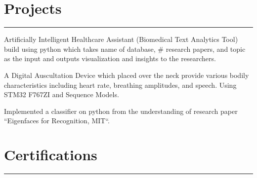 \documentclass[]{rahulworld-resume}
\begin{document}
\begin{minipage}[t]{0.66\textwidth}
\section{Projects}
\noindent\rule{12.5cm}{0.4pt}
\noindent
\hspace{1em}%
\begin{minipage}{0.95\textwidth\vspace{5pt}}
Artificially Intelligent Healthcare Assistant (Biomedical Text Analytics Tool) build using python which takes name of database, # research papers, and topic as the input and outputs visualization and insights to the researchers.
\end{minipage}


\noindent
\hspace{1em}%
\begin{minipage}{0.95\textwidth\vspace{5pt}}
A Digital Auscultation Device which placed over the neck provide various bodily characteristics including heart rate, breathing amplitudes, and speech. Using STM32 F767ZI and Sequence Models.
\end{minipage}


\noindent
\hspace{1em}%
\begin{minipage}{0.95\textwidth\vspace{5pt}}
Implemented a classifier on python from the understanding of research paper “Eigenfaces for Recognition, MIT“.
\end{minipage}

\section{Certifications} 
\noindent\rule{12.5cm}{0.4pt}
 


 

\end{minipage}
\end{document}
